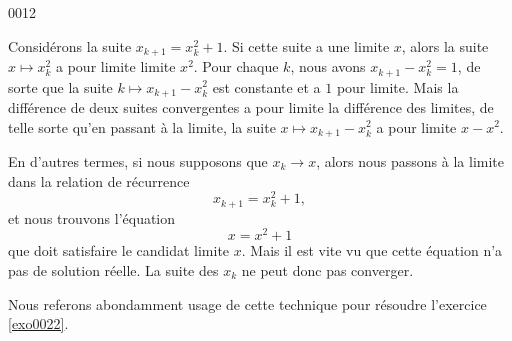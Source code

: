 \begin{corrige}{0012}
\begin{enumerate}
\begin{alternative}
Considérons la suite $x_{k+1}=x_k^2+1$. Si cette suite a une limite $x$, alors la suite $x\mapsto x_k^2$ a pour limite limite $x^2$. Pour chaque $k$, nous avons $x_{k+1}-x_k^2=1$, de sorte que la suite $k\mapsto x_{k+1}-x_k^2$ est constante et a $1$ pour limite. Mais la différence de deux suites convergentes a pour limite la différence des limites, de telle sorte qu'en passant à la limite, la suite $x\mapsto x_{k+1}-x_k^2$ a pour limite $x-x^2$.

En d'autres termes, si nous supposons que $x_k\to x$, alors nous passons à la limite dans la relation de récurrence
\begin{equation}
	x_{k+1}=x_k^2+1,
\end{equation}
et nous trouvons l'équation
\begin{equation}
	x=x^2+1
\end{equation}
que doit satisfaire le candidat limite $x$. Mais il est vite vu que cette équation n'a pas de solution réelle. La suite des $x_k$ ne peut donc pas converger.

Nous referons abondamment usage de cette technique pour résoudre l'exercice \ref{exo0022}.
\end{alternative}

\end{enumerate}

\end{corrige}
